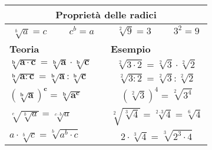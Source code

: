 \documentclass[14pt]{extarticle}
\begin{document}
\begin{table}
    \begin{tabular}{|m{0.5\linewidth}|m{0.5\linewidth}|}
        \hline
        \multicolumn{2}{|c|}{\large{\textbf{Proprietà delle radici}}}\\
        \hline
        \multicolumn{2}{|p{0.9\textwidth}|}{\[\sqrt[b]{a}=c \hspace{1cm} c^b=a   \hspace{1cm} \sqrt[2]{9}=3 \hspace{1cm} 3^2=9 \]}\\
        \hline
        \hline
        \textbf{Teoria} & \textbf{Esempio }\\
        \hline
        \( \mathbf{\sqrt[b]{a\cdot c}=\sqrt[b]{a}\cdot\sqrt[b]{c}}\) & \[\sqrt[2]{3\cdot 2}=\sqrt[2]{3}\cdot\sqrt[2]{2}\]\\
        \hline
        \(\mathbf{\sqrt[b]{a:c}=\sqrt[b]{a}:\sqrt[b]{c}}\) & \[\sqrt[2]{3: 2}=\sqrt[2]{3}:\sqrt[2]{2}\]\\
        \hline
        \(\mathbf{(\sqrt[b]{a})^c=\sqrt[b]{a^c}}\) & \[(\sqrt[2]{3})^4=\sqrt[2]{3^4}\]\\
        \hline
        \(\sqrt[c]{\sqrt[b]{a}}=\sqrt[c\cdot b]{a}\) & \[\sqrt[2]{\sqrt[3]{4}}=\sqrt[2\cdot 3]{4}=\sqrt[6]{4}\]\\
        \hline
        \(a\cdot\sqrt[b]{c}=\sqrt[b]{a^b\cdot c}\)& \[2\cdot\sqrt[3]{4}=\sqrt[3]{2^3\cdot 4}\] \\
        \hline
        \hline
         \end{tabular}
\end{table}
         
\clearpage
\end{document}
